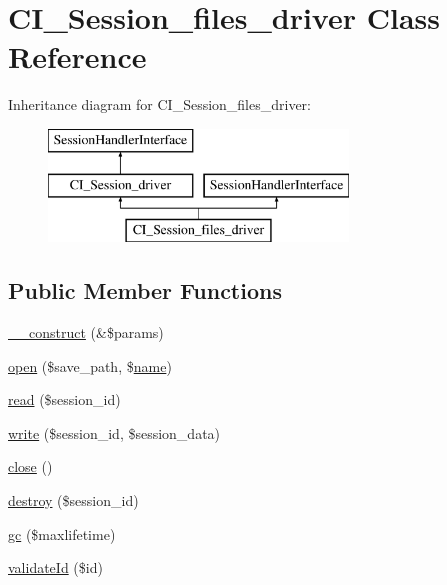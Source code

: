 \hypertarget{class_c_i___session__files__driver}{}\section{C\+I\+\_\+\+Session\+\_\+files\+\_\+driver Class Reference}
\label{class_c_i___session__files__driver}
Inheritance diagram for C\+I\+\_\+\+Session\+\_\+files\+\_\+driver\+:\begin{figure}[H]
\begin{center}
\leavevmode
\includegraphics[height=3.000000cm]{class_c_i___session__files__driver}
\end{center}
\end{figure}
\subsection*{Public Member Functions}
\begin{DoxyCompactItemize}
\item 
\mbox{\hyperlink{class_c_i___session__files__driver_ac1669c73d53d6f16cf5459a1e84d39c8}{\+\_\+\+\_\+construct}} (\&\$params)
\item 
\mbox{\hyperlink{class_c_i___session__files__driver_a614b5cf3840833913c7a73260ed28e02}{open}} (\$save\+\_\+path, \$\mbox{\hyperlink{waiter_2order_8php_afb270cde4944e425a37cf277116a7f43}{name}})
\item 
\mbox{\hyperlink{class_c_i___session__files__driver_a5bbf84ebf657be4eaccc0582377c76bf}{read}} (\$session\+\_\+id)
\item 
\mbox{\hyperlink{class_c_i___session__files__driver_ad9d124885be93668f1dbf6aace5964f5}{write}} (\$session\+\_\+id, \$session\+\_\+data)
\item 
\mbox{\hyperlink{class_c_i___session__files__driver_aa69c8bf1f1dcf4e72552efff1fe3e87e}{close}} ()
\item 
\mbox{\hyperlink{class_c_i___session__files__driver_aaec5812f6b4eb6835f88d3baa06a002a}{destroy}} (\$session\+\_\+id)
\item 
\mbox{\hyperlink{class_c_i___session__files__driver_a57aff7ee0656d8aa75d545fb8b3ae35d}{gc}} (\$maxlifetime)
\item 
\mbox{\hyperlink{class_c_i___session__files__driver_a4a58e8f59b2accc199bbebd5ee52bc74}{validate\+Id}} (\$id)
\end{DoxyCompactItemize}

